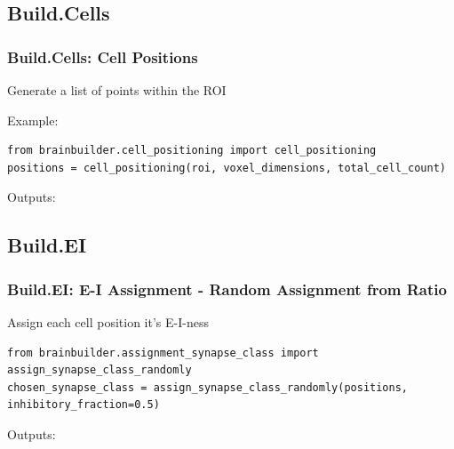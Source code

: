 \documentclass{beamer}
\begin{document}
\subsection{Build.Cells}
\begin{frame}[fragile]
  \frametitle{Build.Cells: Cell Positions}
  Generate a list of points within the ROI

  Example:
\begin{lstlisting}
from brainbuilder.cell_positioning import cell_positioning
positions = cell_positioning(roi, voxel_dimensions, total_cell_count)
\end{lstlisting}

  Outputs:
\end{frame}

\subsection{Build.EI}
\begin{frame}[fragile]
  \frametitle{Build.EI: E-I Assignment - Random Assignment from Ratio}
  Assign each cell position it's E-I-ness
\begin{lstlisting}
from brainbuilder.assignment_synapse_class import assign_synapse_class_randomly
chosen_synapse_class = assign_synapse_class_randomly(positions, inhibitory_fraction=0.5)
\end{lstlisting}
  Outputs:
\end{frame}
\end{document}
